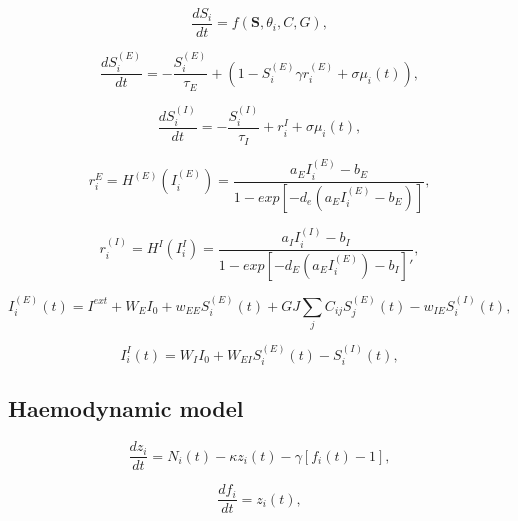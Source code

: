 \documentclass[sn-mathphys-num]{sn-jnl}%
\theoremstyle{thmstyleone}%
\theoremstyle{thmstyletwo}%
\theoremstyle{thmstylethree}%
\begin{document}
\begin{equation}\label{eq:temporal_activity}
	\frac{dS_i}{dt} = f(\boldsymbol{S}, \theta_i, C, G), 
\end{equation}


\begin{equation}\label{eq:synaptic_gating_E}
	\frac{dS_i^{(E)}}{dt} = - \frac{S_i^{(E)}}{\tau_E} + (1-S_i^{(E)} \gamma r_i^(E) + \sigma \mu_i(t)),
\end{equation}

\begin{equation}\label{eq:synaptic_gating_I}
	\frac{dS_i^{(I)}}{dt} = - \frac{S_i^{(I)}}{\tau_I} + r_i^{I} + \sigma \mu_i(t),
\end{equation}

\begin{equation}\label{eq:firing_rate_E}
	r_i^{E} = H^{(E)} (I_i^{(E)}) = \frac{a_E I_i^{(E)} - b_E}{1 - exp[-d_e (a_E I_i^{(E)} - b_E)]},
\end{equation}

\begin{equation}\label{eq:firing_rate_I}
	r_i^{(I)} = H^{I} (I_i^{I}) = \frac{a_I I_i^{(I)} - b_I}{1 - exp[-d_E (a_E I_i^{(E)}) - b_I]'},
\end{equation}

\begin{equation}\label{eq:input_current_E}
	I_i^{(E)}(t) = I^{ext} + W_E I_0 + w_{EE} S_i^{(E)} (t) + G J \sum_j C_{ij} S_j^{(E)}(t) - w_{IE} S_i^{(I)} (t), 
\end{equation}

\begin{equation}\label{eq:input_current_I}
	I_i^{I} (t) = W_I I_0 +
	W_{EI} S_i^{(E)} (t) - 
	S_i^{(I)} (t),
\end{equation}


\subsection{Haemodynamic model} \label{sec:haemodynamic_model}


\begin{equation}\label{eq:vasodilatory_signal}
	\frac{dz_i}{dt} = N_i (t) - 
	\kappa z_i(t) - 
	\gamma [f_i(t) - 1], 
\end{equation}


\begin{equation}\label{eq:blood_inflow}
	\frac{df_i}{dt} = z_i(t),
\end{equation}
\end{document}
